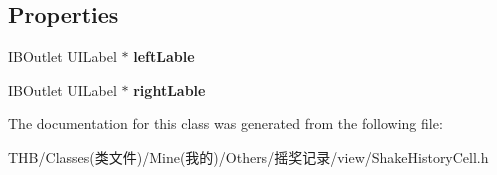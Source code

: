 \subsection*{Properties}
\begin{DoxyCompactItemize}
\item 
\mbox{\label{interface_shake_history_cell_aae2c7afdbaafe54216f758bc80ced4d8}} 
I\+B\+Outlet U\+I\+Label $\ast$ {\bfseries left\+Lable}
\item 
\mbox{\label{interface_shake_history_cell_a03ff56de5026454dce8dde1d720bd466}} 
I\+B\+Outlet U\+I\+Label $\ast$ {\bfseries right\+Lable}
\end{DoxyCompactItemize}


The documentation for this class was generated from the following file\+:\begin{DoxyCompactItemize}
\item 
T\+H\+B/\+Classes(类文件)/\+Mine(我的)/\+Others/摇奖记录/view/Shake\+History\+Cell.\+h\end{DoxyCompactItemize}
